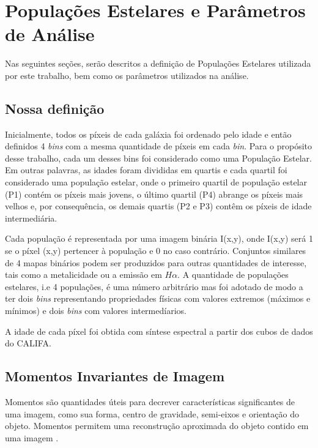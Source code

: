 \chapter{Populações Estelares e Parâmetros de Análise}
\label{cap02}

Nas seguintes seções, serão descritos a definição de Populações Estelares utilizada por este trabalho, bem como os parâmetros utilizados na análise.

\section{Nossa definição}
Inicialmente, todos os píxeis de cada galáxia foi ordenado pelo idade e então definidos 4 \textit{bins} com a mesma quantidade de píxeis em cada \textit{bin}. Para o propósito desse trabalho, cada um desses bins foi considerado como uma População Estelar. Em outras palavras, as idades foram divididas em quartis e cada quartil foi considerado uma população estelar, onde o primeiro quartil de população estelar (P1) contém os píxeis mais jovens, o último quartil (P4) abrange os píxeis mais velhos e, por consequência, os demais quartis (P2 e P3) contêm os píxeis de idade intermediária.

Cada população é representada por uma imagem binária I(x,y), onde I(x,y) será 1 se o píxel (x,y) pertencer à população e 0 no caso contrário. Conjuntos similares de 4 mapas binários podem ser produzidos para outras quantidades de interesse, tais como a metalicidade ou a emissão em $H\alpha$. A quantidade de populações estelares, i.e 4 populações, é uma número arbitrário mas foi adotado de modo a ter dois \textit{bins} representando propriedades físicas com valores extremos (máximos e mínimos) e dois \textit{bins} com valores intermedíarios.

A idade de cada píxel foi obtida com síntese espectral a partir dos cubos de dados do CALIFA.

\section{Momentos Invariantes de Imagem}
\label{moments}
Momentos são quantidades úteis para decrever características significantes de uma imagem, como sua forma, centro de gravidade, semi-eixos e orientação do objeto. Momentos permitem uma reconstrução aproximada do objeto contido em uma imagem \citep{kilian, flusser09}.

